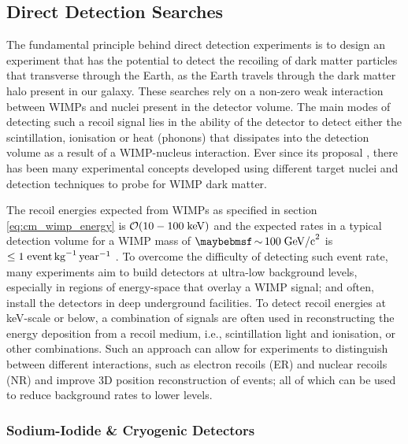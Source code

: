 {\subsection{Direct Detection Searches}
\label{subsec:direct_searches}

The fundamental principle behind direct detection experiments is to design an experiment that has the potential to detect the recoiling of dark matter particles that transverse through the Earth, as the Earth travels through the dark matter halo present in our galaxy. These searches rely on a non-zero weak interaction between WIMPs and nuclei present in the detector volume. The main modes of detecting such a recoil signal lies in the ability of the detector to detect either the scintillation, ionisation or heat (phonons) that dissipates into the detection volume as a result of a WIMP-nucleus interaction. Ever since its proposal \cite{Detectability_of_dm}, there has been many experimental concepts developed using different target nuclei and detection techniques to probe for WIMP dark matter. 

The recoil energies expected from WIMPs as specified in section \ref{eq:cm_wimp_energy} is $\mathcal{O}(10-100 \; \text{keV})$ and the expected rates in a typical detection volume for a WIMP mass of $\sim 100 \; \MathText{GeV/c}^2$ is $\leq 1 \; \text{event} \, \text{kg}^{-1} \, \text{year}^{-1}$ \cite{Baudis_2012}. To overcome the difficulty of detecting such event rate, many experiments aim to build detectors at ultra-low background levels, especially in regions of energy-space that overlay a WIMP signal; and often, install the detectors in deep underground facilities. To detect recoil energies at keV-scale or below, a combination of signals are often used in reconstructing the energy deposition from a recoil medium, i.e., scintillation light and ionisation, or other combinations. Such an approach can allow for experiments to distinguish between different interactions, such as electron recoils (ER) and nuclear recoils (NR) and improve 3D position reconstruction of events; all of which can be used to reduce background rates to lower levels. 

\subsubsection{Sodium-Iodide \& Cryogenic Detectors}
\label{subsec:other_detectors}

}
